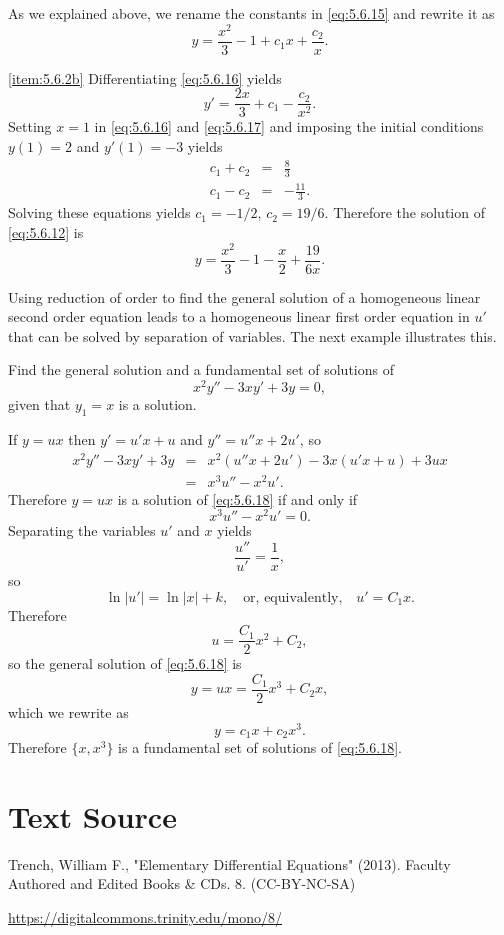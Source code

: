 \documentclass{ximera}
\begin{document}
\begin{example}
\begin{explanation}
As we explained above, we rename the constants in \eqref{eq:5.6.15} and
rewrite it as
\begin{equation}  \label{eq:5.6.16}
y=\frac{x^2}{3}-1+c_1x+\frac{c_2}{x}.
\end{equation}

\ref{item:5.6.2b}   Differentiating  \eqref{eq:5.6.16} yields
\begin{equation} \label{eq:5.6.17}
y'=\frac{2x}{3}+c_1-\frac{c_2}{x^2}.
\end{equation}
 Setting $x=1$ in  \eqref{eq:5.6.16} and  \eqref{eq:5.6.17} and imposing the
initial conditions $y(1)=2$ and $y'(1)=-3$  yields
\begin{eqnarray*}
c_1+c_2&=& \frac{8}{3} \\
c_1-c_2&=& -\frac{11}{3}.
\end{eqnarray*}
Solving these  equations yields $c_1=-1/2$, $c_2=19/6$.
Therefore the solution of \eqref{eq:5.6.12} is
$$
y=\frac{x^2}{3}-1-\frac{x}{2}+\frac{19}{6x}.
$$
\end{explanation}
\end{example}


Using reduction of order to  find the general solution of
a homogeneous linear second order  equation leads to a
homogeneous linear first  order  equation in $u'$ that can be solved
by separation of variables. The next example illustrates this.

\begin{example}\label{example:5.6.3}
 Find the general solution and a fundamental set  of solutions of
\begin{equation}  \label{eq:5.6.18}
x^2y''-3xy'+3y=0,
\end{equation}
 given that $y_1=x$ is a solution.


\begin{explanation}
 If $y=ux$ then $y'=u'x+u$ and $y''=u''x+2u'$, so
\begin{eqnarray*}
x^2y''-3xy'+3y&=&x^2(u''x+2u')-3x(u'x+u)+3ux\\
&=&x^3u''-x^2u'.
\end{eqnarray*}
Therefore $y=ux$ is a solution of \eqref{eq:5.6.18} if and only if
$$
x^3u''-x^2u'=0.
$$
Separating the variables $u'$ and $x$ yields
$$
\frac{u''}{u'}=\frac{1}{x},
$$
so
$$
\ln|u'|=\ln|x|+k,\quad\mbox{or, equivalently,}\quad u'=C_1x.
$$
Therefore
$$
u=\frac{C_1}{2}x^2+C_2,
$$
so the general solution of \eqref{eq:5.6.18} is
$$
y=ux=\frac{C_1}{2}x^3+C_2x,
$$
which we rewrite as
$$
y=c_1x+c_2x^3.
$$
Therefore $\{x,x^3\}$ is  a fundamental set of solutions of
\eqref{eq:5.6.18}.
\end{explanation}
\end{example}


\section*{Text Source}
Trench, William F., "Elementary Differential Equations" (2013). Faculty Authored and Edited Books \& CDs. 8. (CC-BY-NC-SA)

\href{https://digitalcommons.trinity.edu/mono/8/}{https://digitalcommons.trinity.edu/mono/8/}
\end{document}
